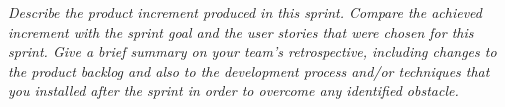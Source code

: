 \emph{Describe the product increment produced in this sprint. Compare the achieved increment with the sprint goal and the user stories that were chosen for this sprint. Give a brief summary on your team's retrospective, including changes to the product backlog and also to the development process and/or techniques that you installed after the sprint in order to overcome any identified obstacle.}